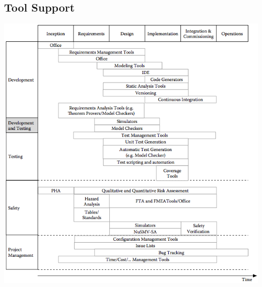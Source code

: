 \documentclass[a4paper, 10pt]{article}
\begin{document}
\subsection*{Tool Support}
\begin{center}
\includegraphics[width=\linewidth]{images/toolSupport.png}
\end{center}
\end{document}
